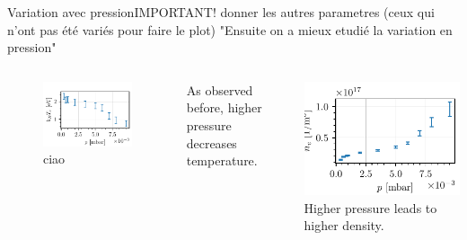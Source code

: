 \documentclass[10pt]{beamer}
\begin{document}
\begin{frame}{Variation avec pression}{IMPORTANT! donner les autres parametres (ceux qui n'ont pas été variés pour faire le plot)}
    "Ensuite on a mieux etudié la variation en pression"
    \begin{columns}
        \centering
        \begin{figure}
            \includegraphics[scale=1]{../figures/temperatureeV_pressure.pdf}
            \caption{ciao}
            
        \end{figure}
        As observed before, higher pressure decreases temperature.

        \centering
        \includegraphics[scale=1]{../figures/density_pressure.pdf}
        Higher pressure leads to higher density.

    \end{columns}
\end{frame}
\end{document}
